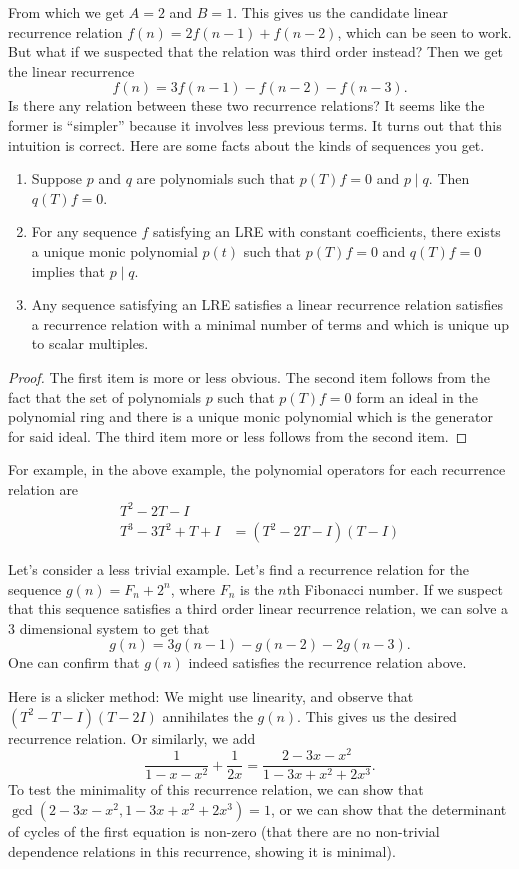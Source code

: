 From which we get $A = 2$ and $B = 1$. This gives us the candidate linear recurrence relation $f(n) = 2f(n-1) + f(n-2)$, which can be seen to work. But what if we suspected that the relation was third order instead? Then we get the linear recurrence 
\[f(n) = 3f(n-1) - f(n-2) - f(n-3).\]
Is there any relation between these two recurrence relations? It seems like the former is ``simpler'' because it involves less previous terms. It turns out that this intuition is correct. Here are some facts about the kinds of sequences you get.
\begin{proposition}
\begin{enumerate}
	\item Suppose $p$ and $q$ are polynomials such that $p(T)f = 0$ and $p \mid q$. Then $q(T)f = 0$.
	\item For any sequence $f$ satisfying an LRE with constant coefficients, there exists a unique monic polynomial $p(t)$ such that $p(T)f = 0$ and $q(T)f = 0$ implies that $p \mid q$. 
	\item Any sequence satisfying an LRE satisfies a linear recurrence relation satisfies a recurrence relation with a minimal number of terms and which is unique up to scalar multiples.
\end{enumerate}
\end{proposition}
\begin{proof}
The first item is more or less obvious. The second item follows from the fact that the set of polynomials $p$ such that $p(T)f = 0$ form an ideal in the polynomial ring and there is a unique monic polynomial which is the generator for said ideal. The third item more or less follows from the second item.
\end{proof}

For example, in the above example, the polynomial operators for each recurrence relation are
\begin{align*}
T^2 - 2T - I & \\
T^3 - 3T^2 + T + I &= (T^2 - 2T - I)(T - I)
\end{align*}

Let's consider a less trivial example. Let's find a recurrence relation for the sequence $g(n) = F_n + 2^n$, where $F_n$ is the $n$th Fibonacci number. If we suspect that this sequence satisfies a third order linear recurrence relation, we can solve a 3 dimensional system to get that 
\[g(n) = 3g(n-1) - g(n-2) - 2g(n-3).\] One can confirm that $g(n)$ indeed satisfies the recurrence relation above.

Here is a slicker method: We might use linearity, and observe that $(T^2 - T - I)(T - 2I)$ annihilates the $g(n)$. This gives us the desired recurrence relation. Or similarly, we add
\[\frac{1}{1 - x - x^2} + \frac{1}{2x} = \frac{2 - 3x - x^2}{1 - 3x + x^2 + 2x^3}.\]
To test the minimality of this recurrence relation, we can show that $\gcd(2 - 3x - x^2, 1 - 3x + x^2 + 2x^3) = 1$, or we can show that the determinant of cycles of the first equation is non-zero (that there are no non-trivial dependence relations in this recurrence, showing it is minimal).

